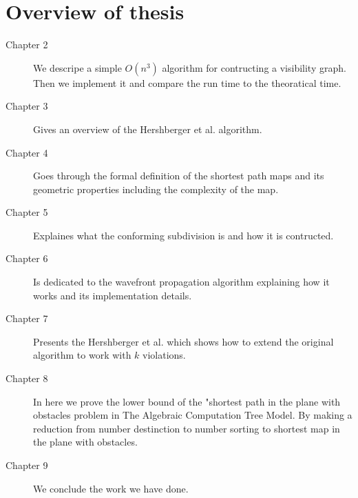 \section{Overview of thesis}
\begin{description}

	\item[Chapter 2] We descripe a simple $O(n^3)$ algorithm for contructing a
		visibility graph. Then we implement it and compare the run time to the
		theoratical time.

	\item [Chapter 3] Gives an overview of the Hershberger et al.
		\cite{HershbergerS99} algorithm.

	\item [Chapter 4] Goes through the formal definition of the shortest path
		maps and its geometric properties including the complexity of the map.

	\item [Chapter 5] Explaines what the conforming subdivision is and how it is
		contructed.

	\item [Chapter 6] Is dedicated to the wavefront propagation algorithm
		explaining how it works and its implementation details.

	\item [Chapter 7] Presents the Hershberger et al. \cite{HershbergerKS17}
		which shows how to extend the original algorithm to work with $k$
		violations.

	\item [Chapter 8] In here we prove the lower bound of the "shortest path in
		the plane with obstacles problem in The Algebraic Computation Tree Model.
		By making a reduction from number destinction to number sorting to
		shortest map in the plane with obstacles.

	\item [Chapter 9] We conclude the work we have done.

\end{description}
